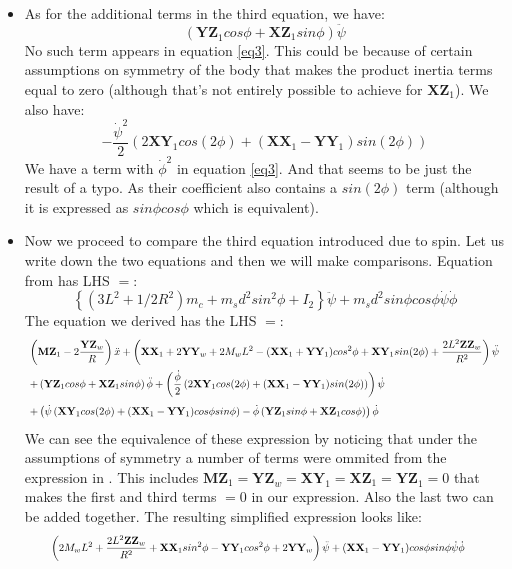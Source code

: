 \documentclass[a4paper,10pt]{article}
\newcommand\scalemath[2]{\scalebox{#1}{\mbox{\ensuremath{\displaystyle #2}}}}
\begin{document}
\begin{itemize}
\item As for the additional terms in the third equation, we have:
\[
 (\mathbf{YZ}_1cos\phi+\mathbf{XZ}_1sin\phi)\ddot\psi
\]
No such term appears in equation \ref{eq3}. This could be because of certain assumptions on symmetry of the body that makes the
product inertia terms equal to zero (although that's not entirely possible to achieve for $\mathbf{XZ}_1$).
We also have:
\[
 -\frac{\dot{\psi}^2}{2}\left(2\mathbf{XY}_1cos(2\phi)+(\mathbf{XX}_1-\mathbf{YY}_1)sin(2\phi)\right)
\]
We have a term with $\dot \phi^2$ in equation \ref{eq3}. And that seems to be just the result of a typo. As their coefficient also
contains a $sin(2\phi)$ term (although it is expressed as $sin\phi cos\phi$ which is equivalent).


\item Now we proceed to compare the third equation introduced due to spin. Let us write down the two equations and then we will make 
comparisons. Equation from \cite{kim2005dynamic} has LHS $=$:
\[
 \left\lbrace(3L^2+1/2R^2)m_c+m_sd^2sin^2\phi+I_2\right\rbrace\ddot{\psi}+m_sd^2sin\phi cos\phi\dot{\psi}\dot{\phi}
\]
The equation we derived has the LHS $=$:
\begin{align}\begin{split} 
&\scalemath{0.75}{\left(\mathbf{MZ}_1-2\frac{\mathbf{YZ}_w}{R}\right)\ddot{x} + \left(\mathbf{XX}_1+2\mathbf{YY}_w+2M_wL^2-(\mathbf{XX}_1+\mathbf{YY}_1)cos^2\phi+\mathbf{XY}_1sin(2\phi)+\frac{2L^2\mathbf{ZZ}_w}{R^2}\right)\ddot{\psi}} \\
&\scalemath{0.75}{+\left(\mathbf{YZ}_1cos\phi+\mathbf{XZ}_1sin\phi\right)\ddot{\phi} + \left(\frac{\dot{\phi}}{2}\left(2\mathbf{XY}_1cos(2\phi)+(\mathbf{XX}_1-\mathbf{YY}_1)sin(2\phi)\right)\right)\dot\psi} \\
&\scalemath{0.75}{+\left(\dot\psi\left(\mathbf{XY}_1cos(2\phi)+(\mathbf{XX}_1-\mathbf{YY}_1)cos\phi sin\phi\right)-\dot\phi\left(\mathbf{YZ}_1sin\phi+\mathbf{XZ}_1cos\phi\right)\right)\dot\phi }
\end{split} \end{align}
We can see the equivalence of these expression by noticing that under the assumptions of symmetry a number of terms were ommited from the
expression in \cite{kim2005dynamic}. This includes $\mathbf{MZ}_1 = \mathbf{YZ}_w = \mathbf{XY}_1 = \mathbf{XZ}_1 = \mathbf{YZ}_1 = 0$ that makes the first 
and third terms $=0$ in our expression. Also the last two can be added together. The resulting simplified expression looks like:
\begin{align}\begin{split} 
&\scalemath{0.75}{\left(2M_wL^2+\frac{2L^2\mathbf{ZZ}_w}{R^2}+\mathbf{XX}_1sin^2\phi-\mathbf{YY}_1cos^2\phi+2\mathbf{YY}_w\right)\ddot{\psi}+(\mathbf{XX}_1-\mathbf{YY}_1)cos\phi sin\phi\dot\psi\dot\phi}
\end{split} \end{align}
\end{itemize}
\end{document}
